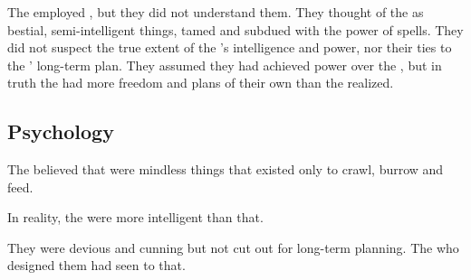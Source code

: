 \subsubsection{\Resphain}
The \resphain employed \noggyaleth, but they did not understand them.
They thought of the \noggyaleth as bestial, semi-intelligent things, tamed and subdued with the power of spells.
They did not suspect the true extent of the \noggyaleth's intelligence and power, nor their ties to the \banelords' long-term plan.
They assumed they had achieved power over the \noggyaleth, but in truth the \noggyaleth had more freedom and plans of their own than the \resphain realized.









\subsection{Psychology}

The \resphain believed that \noggyaleth were mindless things that existed only to crawl, burrow and feed.

In reality, the \noggyaleth were more intelligent than that. 

They were devious and cunning but not cut out for long-term planning.
The \voyagers who designed them had seen to that. 

